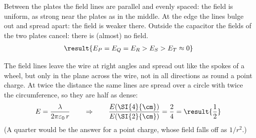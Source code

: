 \begin{abcliste}
\abc Between the plates the field lines are parallel and evenly spaced: the field is uniform, as strong near the plates as in the middle. At the edge the lines bulge out and spread apart: the field is weaker there. Outside the capacitor the fields of the two plates cancel: there is (almost) no field.
\begin{align}
 \result{E_P = E_Q = E_R > E_S > E_T \approx 0}
\end{align}

\abc The field lines leave the wire at right angles and spread out like the spokes of a wheel, but only in the plane across the wire, not in all directions as round a point charge. At twice the distance the same lines are spread over a circle with twice the circumference, so they are half as dense:
\begin{align}
 E = \frac{\lambda}{2\pi\varepsilon_0\,r} \qquad\Rightarrow\qquad \frac{E(\SI{4}{\cm})}{E(\SI{2}{\cm})} = \frac{2}{4} = \result{\frac{1}{2}}
\end{align}
(A quarter would be the answer for a point charge, whose field falls off as $1/r^2$.)
\end{abcliste}
